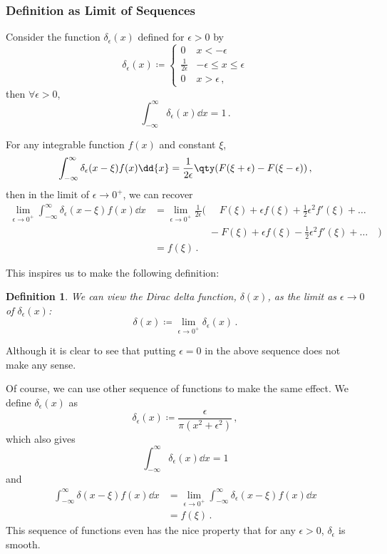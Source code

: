 \documentclass{article}
\theoremstyle{plain}\theoremheaderfont{\normalfont\itshape}\theorembodyfont{\rmfamily}\theoremseparator{.}\newtheorem*{rem}{Remark}\newtheorem*{ex}{Example}\newtheorem*{proof}{Proof}\newtheorem*{altp}{Alternative proof}
\theoremstyle{plain}\theoremheaderfont{\normalfont\bfseries}\theorembodyfont{\rmfamily}\theoremseparator{.}\newtheorem{thm}{Theorem}[section]\newtheorem{lem}[thm]{Lemma}\newtheorem{prop}[thm]{Proposition}\newtheorem*{cor}{Corollary}\newtheorem{defn}[thm]{Definition}\newtheorem{clm}[thm]{Claim}\newtheorem{clminproof}{Claim}
\theoremstyle{break}\theoremheaderfont{\normalfont\itshape}\theorembodyfont{\rmfamily}\theoremseparator{.\medskip}\newtheorem*{proofskip}{Proof}\newtheorem*{exs}{Examples}\newtheorem*{rems}{Remarks}
\theoremstyle{break}\theoremheaderfont{\normalfont\bfseries}\theorembodyfont{\rmfamily}\theoremseparator{.\medskip}\newtheorem{lemskip}[thm]{Lemma}\newtheorem{defnskip}[thm]{Definition}\newtheorem{propskip}[thm]{Proposition}\newtheorem{thmskip}[thm]{Theorem}
\numberwithin{equation}{section}
\begin{document}
	\subsubsection{Definition as Limit of Sequences}
	Consider the function \(\delta_\epsilon(x)\) defined for \(\epsilon>0\) by
	\[\delta_\epsilon(x)\coloneqq\begin{cases}
		0 & x<-\epsilon\\
		\frac{1}{2\epsilon} & -\epsilon\le x\le \epsilon\\
		0 & x>\epsilon\,,
	\end{cases}\]
	then \(\forall\epsilon>0\),
	\[\int_{-\infty}^{\infty}\delta_\epsilon(x)\dd{x}=1\,.\]
	
	For any integrable function \(f(x)\) and constant \(\xi\),
	\[\int_{-\infty}^{\infty}\delta_\epsilon(x-\xi)f(x)\dd{x}=\frac{1}{2\epsilon}\qty(F(\xi+\epsilon)-F(\xi-\epsilon))\,,\]
	then in the limit of \(\epsilon\to 0^+\), we can recover
	\begin{align*}
		\lim_{\epsilon\to 0^+}\int_{-\infty}^{\infty}\delta_\epsilon(x-\xi)f(x)\dd{x}&=\lim_{\epsilon\to 0^+}\frac{1}{2\epsilon}\Big(\,\,\quad F(\xi)+\epsilon f(\xi)+\frac{1}{2}\epsilon^2 f'(\xi)+\dots\;&\\
		&\qquad\quad\qquad\,\,\,-F(\xi)+\epsilon f(\xi)-\frac{1}{2}\epsilon^2f'(\xi)+\dots\quad\Big)\\
		&=f(\xi)\,.
	\end{align*}
	
	This inspires us to make the following definition:
	\begin{defn}
		We can view the \textit{Dirac delta function}, \(\delta(x)\), as the limit as \(\epsilon\to 0\) of \(\delta_\epsilon(x)\):
		\[\delta(x)\coloneqq\lim_{\epsilon\to 0^+}\delta_{\epsilon}(x)\,.\]
	\end{defn}
	Although it is clear to see that putting \(\epsilon=0\) in the above sequence does not make any sense.
	
	Of course, we can use other sequence of functions to make the same effect. We define \(\delta_\epsilon(x)\) as
	\[\delta_\epsilon(x)\coloneqq\frac{\epsilon}{\pi(x^2+\epsilon^2)}\,,\]
	which also gives
	\[\int_{-\infty}^{\infty}\delta_\epsilon(x)\dd{x}=1\]
	and
	\begin{align*}
		\int_{-\infty}^{\infty}\delta(x-\xi)f(x)\dd{x}&=\lim_{\epsilon\to 0^+}\int_{-\infty}^{\infty}\delta_\epsilon(x-\xi)f(x)\dd{x}\\
		&=f(\xi)\,.
	\end{align*}
	This sequence of functions even has the nice property that for any \(\epsilon>0\), \(\delta_\epsilon\) is smooth.
	
\end{document}
